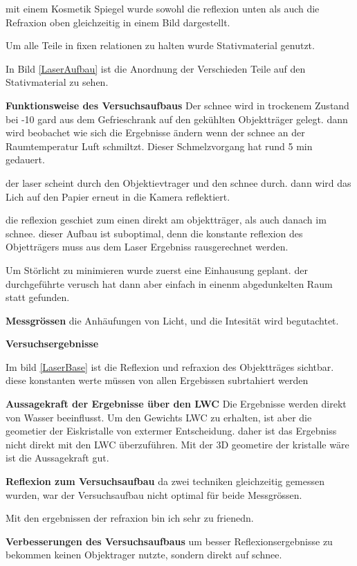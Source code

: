 mit einem Kosmetik Spiegel wurde sowohl die reflexion unten als auch die Refraxion oben gleichzeitig in einem Bild dargestellt.

Um alle Teile in fixen relationen zu halten wurde Stativmaterial genutzt.

In Bild \ref{LaserAufbau} ist die Anordnung der Verschieden Teile auf den Stativmaterial zu sehen.

\textbf{Funktionsweise des Versuchsaufbaus}
Der schnee wird in trockenem Zustand bei -10 gard aus dem Gefrieschrank auf den gekühlten Objektträger gelegt. dann wird beobachet wie sich die Ergebnisse ändern wenn der schnee an der Raumtemperatur Luft schmiltzt. Dieser Schmelzvorgang hat rund 5 min gedauert.

der laser scheint durch den Objektievtrager und den schnee durch. dann wird das Lich auf den Papier erneut in die Kamera reflektiert.

die reflexion geschiet zum einen direkt am objektträger, als auch danach im schnee. dieser Aufbau ist suboptimal, denn die konstante reflexion des Objetträgers muss aus dem Laser Ergebniss rausgerechnet werden.

Um Störlicht zu minimieren wurde zuerst eine Einhausung geplant. der durchgeführte verusch hat dann aber einfach in einenm abgedunkelten Raum statt gefunden.

\textbf{Messgrössen}
die Anhäufungen von Licht, und die Intesität wird begutachtet.

\textbf{Versuchsergebnisse}

Im bild \ref{LaserBase} ist die Reflexion und refraxion des Objektträges sichtbar. diese konstanten werte müssen von allen Ergebissen subrtahiert werden

\textbf{Aussagekraft der Ergebnisse über den LWC} Die Ergebnisse werden direkt von Wasser beeinflusst. Um den Gewichts LWC zu erhalten, ist aber die geometier der Eiskristalle von extermer Entscheidung. daher ist das Ergebniss nicht direkt mit den LWC überzuführen. Mit der 3D geometire der kristalle wäre ist die Aussagekraft gut.

\textbf{Reflexion zum Versuchsaufbau}
da zwei techniken gleichzeitig gemessen wurden, war der Versuchsaufbau nicht optimal für beide Messgrössen.

Mit den ergebnissen der refraxion bin ich sehr zu frienedn.

\textbf{Verbesserungen des Versuchsaufbaus}
um besser Reflexionsergebnisse zu bekommen keinen Objektrager nutzte, sondern direkt auf schnee.

